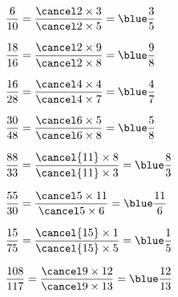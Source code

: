    \begin{colenumerate}{2}
      \item $\dfrac{6}{10} =\dfrac{\cancel2\times3}{\cancel2\times5} =\blue\dfrac35$ \bigskip
      \item $\dfrac{18}{16} =\dfrac{\cancel2\times9}{\cancel2\times8} =\blue\dfrac98$ \bigskip
      \item $\dfrac{16}{28} =\dfrac{\cancel4\times4}{\cancel4\times7} =\blue\dfrac47$ \bigskip
      \item $\dfrac{30}{48} =\dfrac{\cancel6\times5}{\cancel6\times8} =\blue\dfrac58$ \bigskip
      \item $\dfrac{88}{33} =\dfrac{\cancel{11}\times8}{\cancel{11}\times3} =\blue\dfrac83$ \bigskip
      \item $\dfrac{55}{30} =\dfrac{\cancel5\times11}{\cancel5\times6} =\blue\dfrac{11}6$ \bigskip
      \item $\dfrac{15}{75} =\dfrac{\cancel{15}\times1}{\cancel{15}\times5} =\blue\dfrac15$ \bigskip
      \item $\dfrac{108}{117} =\dfrac{\cancel9\times12}{\cancel9\times13} =\blue\dfrac{12}{13}$
   \end{colenumerate}
